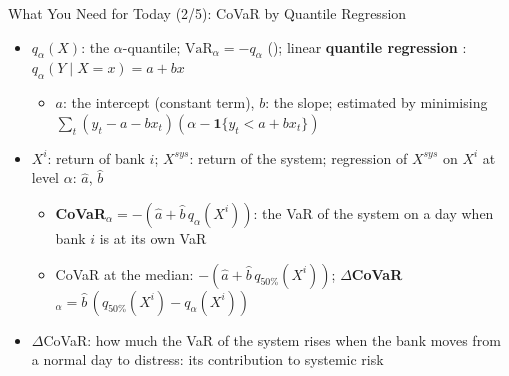 \begin{frame}{What You Need for Today (2/5): CoVaR by Quantile Regression}
\itemsize{\small}
\begin{itemize}
    \item $q_\alpha(X)$: the $\alpha$-quantile; $\mathrm{VaR}_\alpha = -q_\alpha$ (); linear \textbf{quantile regression} : $q_\alpha(Y \mid X = x) = a + bx$
    \begin{itemize}
        \item $a$: the intercept (constant term), $b$: the slope; estimated by minimising $\sum_t (y_t - a - bx_t)(\alpha - \mathbf{1}\{y_t < a + bx_t\})$
    \end{itemize}
    \item $X^i$: return of bank $i$; $X^{sys}$: return of the system; regression of $X^{sys}$ on $X^i$ at level $\alpha$: $\hat a$, $\hat b$ 
    \begin{itemize}
        \item \textbf{CoVaR}$_\alpha = -(\hat a + \hat b\,q_\alpha(X^i))$: the VaR of the system on a day when bank $i$ is at its own VaR
        \item CoVaR at the median: $-(\hat a + \hat b\,q_{50\%}(X^i))$; \textbf{$\Delta$CoVaR}$_\alpha = \hat b\,(q_{50\%}(X^i) - q_\alpha(X^i))$
    \end{itemize}
    \item $\Delta$CoVaR: how much the VaR of the system rises when the bank moves from a normal day to distress: its contribution to systemic risk
\end{itemize}
\end{frame}

